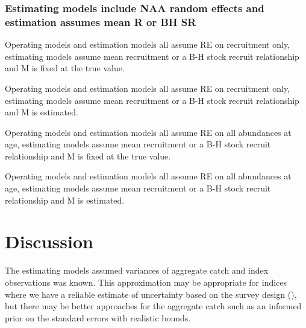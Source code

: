 \documentclass[
  12pt,
]{article}
\begin{document}
\hypertarget{estimating-models-include-naa-random-effects-and-estimation-assumes-mean-r-or-bh-sr}{%
\subsubsection{Estimating models include NAA random effects and
estimation assumes mean R or BH
SR}\label{estimating-models-include-naa-random-effects-and-estimation-assumes-mean-r-or-bh-sr}}

\clearpage

\begin{table}
\caption{Operating models and estimation models all assume RE on recruitment only, estimating models assume mean recruitment or a B-H stock recruit relationship and M is fixed at the true value.}
{}
\end{table}

\begin{table}
\caption{Operating models and estimation models all assume RE on recruitment only, estimating models assume mean recruitment or a B-H stock recruit relationship and M is estimated.}
{}
\end{table}

\begin{table}
\caption{Operating models and estimation models all assume RE on all abundances at age, estimating models assume mean recruitment or a B-H stock recruit relationship and M is fixed at the true value.}
{}
\end{table}

\begin{table}
\caption{Operating models and estimation models all assume RE on all abundances at age, estimating models assume mean recruitment or a B-H stock recruit relationship and M is estimated.}
{}
\end{table}
\clearpage

\hypertarget{discussion}{%
\section{Discussion}\label{discussion}}

The estimating models assumed variances of aggregate catch and index
observations was known. This approximation may be appropriate for
indices where we have a reliable estimate of uncertainty based on the
survey design (), but there may be better approaches for the aggregate
catch such as an informed prior on the standard errors with realistic
bounds.
\end{document}
